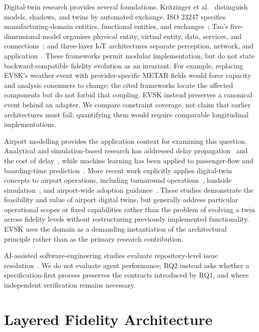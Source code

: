 \documentclass[runningheads]{llncs}
\begin{document}
Digital-twin research provides several foundations. Kritzinger et al.~\cite{kritzinger2018} distinguish models, shadows, and twins by automated exchange. ISO 23247 specifies manufacturing-domain entities, functional entities, and exchanges~\cite{iso23247}; Tao's five-dimensional model organises physical entity, virtual entity, data, services, and connections~\cite{tao2018}; and three-layer IoT architectures separate perception, network, and application~\cite{sethi2017}. These frameworks permit modular implementation, but do not state backward-compatible fidelity evolution as an invariant. For example, replacing EVSK's weather event with provider-specific METAR fields would force capacity and analysis consumers to change; the cited frameworks locate the affected components but do not forbid that coupling. EVSK instead preserves a canonical event behind an adapter. We compare constraint coverage, not claim that earlier architectures must fail; quantifying them would require comparable longitudinal implementations.

Airport modelling provides the application context for examining this question. Analytical and simulation-based research has addressed delay propagation~\cite{pyrgiotis2013} and the cost of delay~\cite{cook2009}, while machine learning has been applied to passenger-flow and boarding-time prediction~\cite{ke2017,schultz2019}. More recent work explicitly applies digital-twin concepts to airport operations, including turnaround operations~\cite{conde2024}, landside simulation~\cite{palasca2025}, and airport-wide adoption guidance~\cite{acrp2024}. These studies demonstrate the feasibility and value of airport digital twins, but generally address particular operational scopes or fixed capabilities rather than the problem of evolving a twin across fidelity levels without restructuring previously implemented functionality. EVSK uses the domain as a demanding instantiation of the architectural principle rather than as the primary research contribution.

AI-assisted software-engineering studies evaluate repository-level issue resolution~\cite{swebench2024}. We do not evaluate agent performance; RQ2 instead asks whether a specification-first process preserves the contracts introduced by RQ1, and where independent verification remains necessary.

\section{Layered Fidelity Architecture}\label{sec:architecture}
\end{document}
